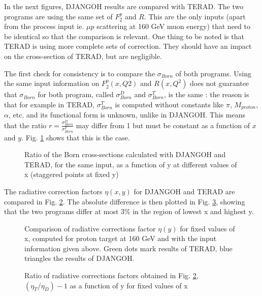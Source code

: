 In the next figures, DJANGOH results are compared with TERAD\cite{TERAD}. The two programs are using the same set of
$F^{p}_{2}$ and $R$. This are the only inputs (apart from the process input ie. $\mu p$ scattering
at 160 GeV muon energy) that need to be identical so that the comparison is relevant.
One thing to be noted is that TERAD is using more complete sets of correction. They should have
an impact on the cross-section of TERAD, but are negligible.

The first check for consistency is to compare the $\sigma_{Born}$ of both programs.
Using the same input information on $F^{p}_{2}(x,Q2)$ and $R(x, Q^2)$ does not guarantee that $\sigma_{Born}$
for both program, called $\sigma^{D}_{Born}$ and $\sigma^{T}_{Born}$, is the same : the reason is that for example
in TERAD, $\sigma^{T}_{Born}$ is computed without constants like $\pi$, $M_{proton}$, $\alpha$, etc. and
its functional form is unknown, unlike in DJANGOH. This means that the ratio $r=\frac{\sigma^{D}_{Born}}{\sigma^{T}_{Born}}$
may differ from 1 but must be constant as a function of $x$ and $y$. Fig. \ref{fig:BRy} shows that this
is the case.

\begin{figure}[htb]
\centerline{}
\caption{Ratio of the Born cross-sections calculated with DJANGOH and TERAD, for the same input, as a function of y
at different values of x (staggered points at fixed y)}\label{fig:BRy}
\end{figure}

The radiative correction factors $\eta(x,y)$ for DJANGOH and TERAD are compared in Fig. \ref{fig:RCy}. The absolute
difference is then plotted in Fig. \ref{fig:ERy}, showing that the two programs differ at most 3\% in the region
of lowest x and highest y.


\begin{figure}[htb]
\centerline{}
\caption{Comparison of radiative corrections factor $\eta(y)$ for fixed values of x, computed for proton target at 160 GeV
and with the input information given above. Green dots mark results of TERAD, blue triangles the results of DJANGOH.}\label{fig:RCy}
\end{figure}

\begin{figure}[htb]
\centerline{}
\caption{Ratio of radiative corrections factors obtained in Fig. \ref{fig:RCy}, $(\eta_T/\eta_D)-1$ as a function of y for fixed values of x}\label{fig:ERy}
\end{figure}
